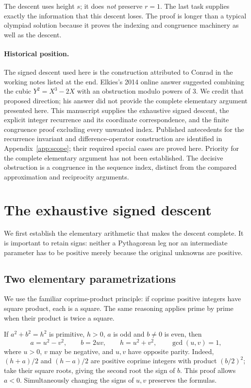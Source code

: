 \documentclass[11pt,a4paper]{article}
\theoremstyle{definition}
\begin{document}
The descent uses height \(s\); it does \emph{not} preserve \(r=1\).
The last task supplies exactly the information that this descent loses.
The proof is longer than a typical olympiad solution because it proves
the indexing and congruence machinery as well as the descent.

\paragraph{Historical position.}
The signed descent used here is the construction attributed to Conrad
in the working notes listed at the end. Elkies's 2014 online answer
suggested combining the cubic \(Y^2=X^3-2X\) with an obstruction modulo
powers of \(3\). We credit that proposed direction; his answer did not
provide the complete elementary argument presented here.
This manuscript supplies the exhaustive signed descent, the explicit
integer recurrence and its coordinate correspondence, and the finite
congruence proof excluding every unwanted index. Published antecedents
for the recurrence invariant and difference-operator construction are
identified in Appendix~\ref{app:scope}; their required special cases
are proved here. Priority for the complete elementary argument has not
been established. The decisive obstruction is a congruence in the
sequence index, distinct from the compared approximation and reciprocity
arguments.

\section{The exhaustive signed descent}\label{sec:descent}

We first establish the elementary arithmetic that makes the descent
complete. It is important to retain signs: neither a Pythagorean leg
nor an intermediate parameter has to be positive merely because the
original unknowns are positive.

\subsection{Two elementary parametrizations}

We use the familiar coprime-product principle: if coprime positive
integers have square product, each is a square. The same reasoning
applies prime by prime when their product is twice a square.

If \(a^2+b^2=h^2\) is primitive, \(h>0\), \(a\) is odd and
\(b\ne0\) is even, then
\[
 a=u^2-v^2,\qquad b=2uv,\qquad h=u^2+v^2,
 \qquad \gcd(u,v)=1,
\]
where \(u>0\), \(v\) may be negative, and \(u,v\) have opposite
parity. Indeed, \((h+a)/2\) and \((h-a)/2\) are positive coprime
integers with product \((b/2)^2\); take their square roots, giving
the second root the sign of \(b\). This proof allows \(a<0\).
Simultaneously changing the signs of \(u,v\) preserves the formulas.
\end{document}

